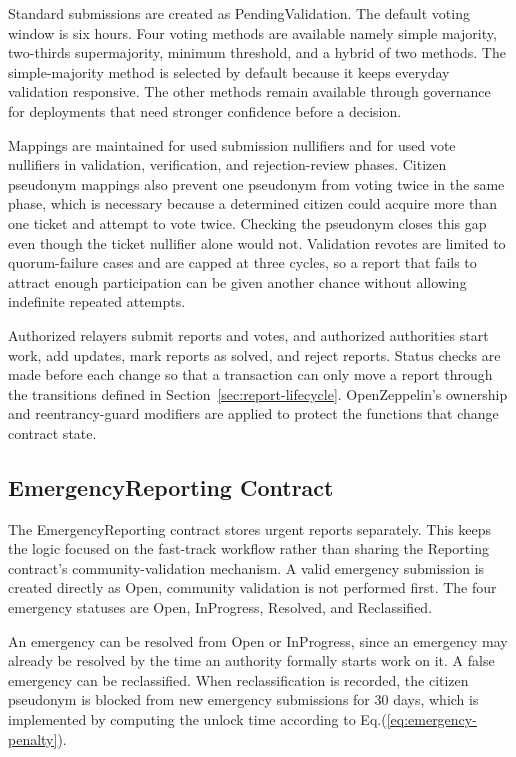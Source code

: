 Standard submissions are created as PendingValidation. The default voting window is six hours. Four voting methods are available namely simple majority, two-thirds supermajority, minimum threshold, and a hybrid of two methods. The simple-majority method is selected by default because it keeps everyday validation responsive. The other methods remain available through governance for deployments that need stronger confidence before a decision.

Mappings are maintained for used submission nullifiers and for used vote nullifiers in validation, verification, and rejection-review phases. Citizen pseudonym mappings also prevent one pseudonym from voting twice in the same phase, which is necessary because a determined citizen could acquire more than one ticket and attempt to vote twice. Checking the pseudonym closes this gap even though the ticket nullifier alone would not. Validation revotes are limited to quorum-failure cases and are capped at three cycles, so a report that fails to attract enough participation can be given another chance without allowing indefinite repeated attempts.

Authorized relayers submit reports and votes, and authorized authorities start work, add updates, mark reports as solved, and reject reports. Status checks are made before each change so that a transaction can only move a report through the transitions defined in Section~\ref{sec:report-lifecycle}. OpenZeppelin's ownership and reentrancy-guard modifiers are applied to protect the functions that change contract state.

\subsection{EmergencyReporting Contract}
\label{subsec:emergency-contract}

The EmergencyReporting contract stores urgent reports separately. This keeps the logic focused on the fast-track workflow rather than sharing the Reporting contract's community-validation mechanism. A valid emergency submission is created directly as Open, community validation is not performed first. The four emergency statuses are Open, InProgress, Resolved, and Reclassified.

An emergency can be resolved from Open or InProgress, since an emergency may already be resolved by the time an authority formally starts work on it. A false emergency can be reclassified. When reclassification is recorded, the citizen pseudonym is blocked from new emergency submissions for 30 days, which is implemented by computing the unlock time according to Eq.(\ref{eq:emergency-penalty}).

